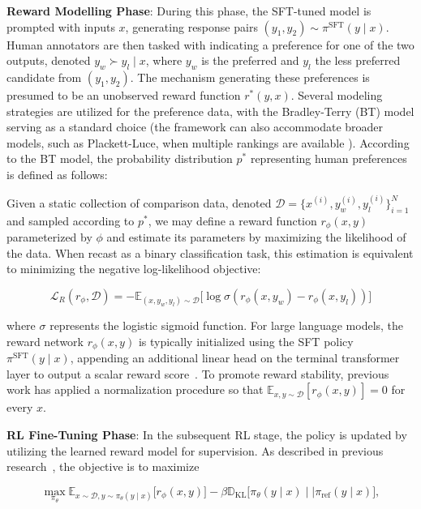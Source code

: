\textbf{Reward Modelling Phase}: During this phase, the SFT-tuned model is prompted with inputs $x$, generating response pairs $(y_1, y_2)\sim \pi^\text{SFT}(y \mid x)$. Human annotators are then tasked with indicating a preference for one of the two outputs, denoted $y_w\succ y_l \mid x$, where $y_w$ is the preferred and $y_l$ the less preferred candidate from $(y_1, y_2)$. The mechanism generating these preferences is presumed to be an unobserved reward function $r^*(y, x)$. Several modeling strategies are utilized for the preference data, with the Bradley-Terry (BT) model \cite{bradley1952rankanalysis} serving as a standard choice (the framework can also accommodate broader models, such as Plackett-Luce, when multiple rankings are available \citep{plackett1975analysis, luce2012individual}). According to the BT model, the probability distribution $p^*$ representing human preferences is defined as follows:

Given a static collection of comparison data, denoted $\mathcal{D}=\bigl\{x^{(i)}, y_w^{(i)}, y_l^{(i)}\bigr\}_{i=1}^N$ and sampled according to $p^*$, we may define a reward function $r_{\phi}(x, y)$ parameterized by $\phi$ and estimate its parameters by maximizing the likelihood of the data. When recast as a binary classification task, this estimation is equivalent to minimizing the negative log-likelihood objective:

\begin{equation}\label{eq:reward_model}
    \mathcal{L}_R(r_{\phi}, \mathcal{D}) = -\mathbb{E}_{(x, y_w, y_l)\sim \mathcal{D}}\bigl[\log \sigma(r_{\phi}(x, y_w)- r_{\phi}(x, y_l))\bigr]
\end{equation}

where $\sigma$ represents the logistic sigmoid function. For large language models, the reward network $r_{\phi}(x, y)$ is typically initialized using the SFT policy $\pi^\text{SFT}(y \mid x)$, appending an additional linear head on the terminal transformer layer to output a scalar reward score~\cite{ziegler2020finetuning}. To promote reward stability, previous work has applied a normalization procedure so that $\mathbb{E}_{x,y\sim \mathcal{D}}\left[r_\phi(x, y)\right] = 0$ for every $x$.

\textbf{RL Fine-Tuning Phase}: In the subsequent RL stage, the policy is updated by utilizing the learned reward model for supervision. As described in previous research~\citep{jaques2017sequence, jaques2020human}, the objective is to maximize

\begin{equation}\label{eq:RL}
\max_{\pi_{\theta}}  \mathbb{E}_{x\sim \mathcal{D}, y\sim \pi_{\theta}(y \mid x)}\bigl[r_{\phi}(x, y)\bigr] - \beta\mathbb{D}_{\textrm{KL}}\bigl[\pi_{\theta}(y\mid x)\mid \mid \pi_\text{ref}(y\mid x)\bigr],
\end{equation}

